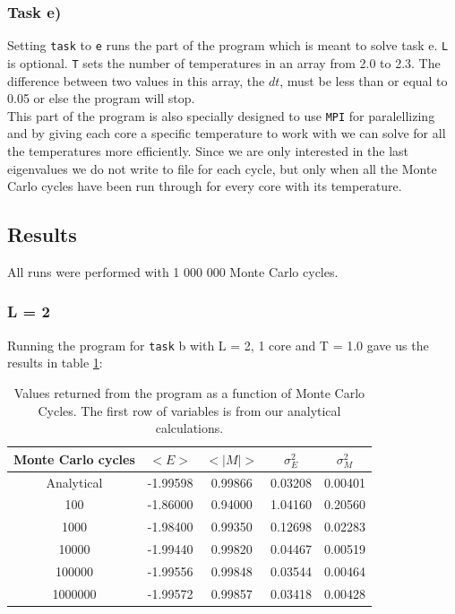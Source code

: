 \documentclass{article}
\begin{document}
\subsubsection*{Task e)}
Setting \texttt{task} to \texttt{e} runs the part of the program which is meant to solve task e. \texttt{L} is optional. \texttt{T} sets the number of temperatures in an array from 2.0 to 2.3. The difference between two values in this array, the $dt$, must be less than or equal to 0.05 or else the program will stop. \\
This part of the program is also specially designed to use \texttt{MPI} for paralellizing and by giving each core a specific temperature to work with we can solve for all the temperatures more efficiently. Since we are only interested in the last eigenvalues we do not write to file for each cycle, but only when all the Monte Carlo cycles have been run through for every core with its temperature.

\subsection*{Results}
All runs were performed with 1 000 000 Monte Carlo cycles.
\subsubsection*{L = 2}
Running the program for \texttt{task} b with L = 2, 1 core and T = 1.0 gave us the results in table \ref{tab:taskb}:
\begin{table}[H]
\centering
\caption{Values returned from the program as a function of Monte Carlo Cycles. The first row of variables is from our analytical calculations.}
\begin{tabular}{c|c|c|c|c}
 Monte Carlo cycles & $<E>$ & $<|M|> $& $\sigma_E^2$ & $\sigma_M^2$ \\ \hline
Analytical &-1.99598 & 0.99866 & 0.03208 & 0.00401 \\
100     &-1.86000    & 0.94000 & 1.04160 & 0.20560 \\
1000    &-1.98400    & 0.99350 & 0.12698 & 0.02283 \\
10000   &-1.99440    & 0.99820 & 0.04467 & 0.00519 \\
100000  & -1.99556   & 0.99848 & 0.03544 & 0.00464 \\
1000000 &-1.99572    & 0.99857 & 0.03418 & 0.00428 
\end{tabular}
\label{tab:taskb}
\end{table}
\end{document}
